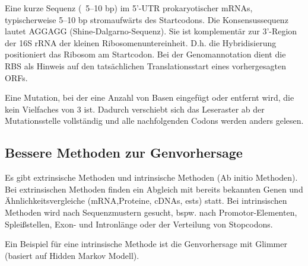 \begin{mybox}[title=Die \gls{rbs}]
Eine kurze Sequenz (~5–10 bp) im 5'-UTR prokaryotischer mRNAs, typischerweise 5–10 bp stromaufwärts des Startcodons. Die Konsensussequenz lautet AGGAGG (Shine-Dalgarno-Sequenz). Sie ist komplementär zur 3'-Region der 16S rRNA der kleinen Ribosomenuntereinheit. D.h. die Hybridisierung positioniert das Ribosom am Startcodon. Bei der Genomannotation dient die RBS als Hinweis auf den tatsächlichen Translationsstart eines vorhergesagten ORFs. 
\end{mybox}
\begin{mybox}[title=Definition Frameshift]
Eine Mutation, bei der eine Anzahl von Basen eingefügt oder entfernt wird, die kein Vielfaches von 3 ist. Dadurch verschiebt sich das Leseraster ab der Mutationsstelle vollständig und alle nachfolgenden Codons werden anders gelesen.
\end{mybox}

\subsection{Bessere Methoden zur Genvorhersage}
Es gibt extrinsische Methoden und intrinsische Methoden (Ab initio Methoden).  Bei extrinsischen Methoden finden ein Abgleich mit bereits bekannten Genen und Ähnlichkeitsvergleiche (mRNA,Proteine, cDNAs, \glspl{est}) statt. Bei intrinsischen Methoden wird nach Sequenzmustern gesucht, bspw. nach Promotor-Elementen, Spleißstellen, Exon- und Intronlänge oder der Verteilung von Stopcodons. 

Ein Beispiel für eine intrinsische Methode ist die Genvorhersage mit Glimmer (basiert auf Hidden Markov Modell).

